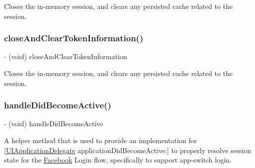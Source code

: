 Closes the in-\/memory session, and clears any persisted cache related to the session. \mbox{\label{interfaceFBSession_ac4ad0564da77b3cecc0c67f762f5f1c7}} 
\subsubsection{\texorpdfstring{close\+And\+Clear\+Token\+Information()}{closeAndClearTokenInformation()}\hspace{0.1cm}{\footnotesize\ttfamily [5/5]}}
{\footnotesize\ttfamily -\/ (void) close\+And\+Clear\+Token\+Information \begin{DoxyParamCaption}{ }\end{DoxyParamCaption}}

Closes the in-\/memory session, and clears any persisted cache related to the session. \mbox{\label{interfaceFBSession_a647536f4770fc746b6865ad610779767}} 
\subsubsection{\texorpdfstring{handle\+Did\+Become\+Active()}{handleDidBecomeActive()}\hspace{0.1cm}{\footnotesize\ttfamily [1/5]}}
{\footnotesize\ttfamily -\/ (void) handle\+Did\+Become\+Active \begin{DoxyParamCaption}{ }\end{DoxyParamCaption}}

A helper method that is used to provide an implementation for \mbox{[}\hyperlink{classUIApplicationDelegate-p}{U\+I\+Application\+Delegate} application\+Did\+Become\+Active\+:\mbox{]} to properly resolve session state for the \hyperlink{interfaceFacebook}{Facebook} Login flow, specifically to support app-\/switch login. \mbox{\label{interfaceFBSession_a647536f4770fc746b6865ad610779767}} 
